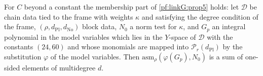 \begin{theorem}\label{pf:linkG:memb}
For $C$ beyond a constant the membership part of \cref{pf:linkG:prop5} holds: let $\mathcal D$ be chain data tied to the frame with
weights $\kappa$ and satisfying the degree condition of the frame, $(\rho,d_{\mathrm{Pl}},d_{\mathrm{No}})$ block data, $N_0$ a norm test for
$\kappa$, and $G_p$ an integral polynomial in the model variables which lies in the $Y$-space of $\mathcal D$ with the constants
$(24,60)$ and whose monomials are mapped into $\mathcal P_r(d_{\mathrm{Pl}})$ by the substitution $\varphi$ of the model variables. Then
$\mathrm{asm}_\rho(\varphi(G_p),N_0)$ is a sum of one-sided elements of multidegree $d$.
\end{theorem}

